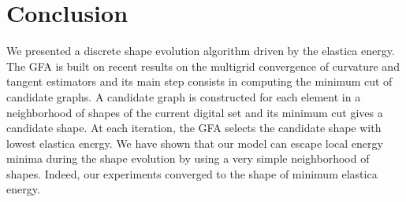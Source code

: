 \documentclass[review]{siamart220329}
\begin{document}

%
%
%
%
%
%
\section{Conclusion}
%
%
We presented a discrete shape evolution algorithm driven by the elastica energy.
The GFA is built on recent results on the multigrid convergence of curvature and
tangent estimators and its main step consists in computing the minimum cut of
candidate graphs. A candidate graph is constructed for each element in a
neighborhood of shapes of the current digital set and its minimum cut gives a
candidate shape. At each iteration, the GFA selects the candidate shape with
lowest elastica energy. We have shown that our model can escape local energy
minima during the shape evolution by using a very simple neighborhood of shapes.
Indeed, our experiments converged to the shape of minimum elastica energy. 
\end{document}
